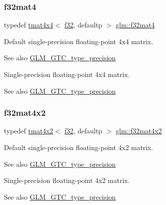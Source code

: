 \subsubsection{\texorpdfstring{f32mat4}{f32mat4}}
{\footnotesize\ttfamily typedef \hyperlink{structglm_1_1tmat4x4}{tmat4x4}$<$ \hyperlink{group__gtc__type__precision_ga0ec999b57f5330d9021256e96038df04}{f32}, defaultp $>$ \hyperlink{group__gtc__type__precision_ga47bc5ddfbd368423c9b762c03ba7e77f}{glm\+::f32mat4}}

Default single-\/precision floating-\/point 4x4 matrix. \begin{DoxySeeAlso}{See also}
\hyperlink{group__gtc__type__precision}{G\+L\+M\+\_\+\+G\+T\+C\+\_\+type\+\_\+precision}
\end{DoxySeeAlso}
Single-\/precision floating-\/point 4x4 matrix. \begin{DoxySeeAlso}{See also}
\hyperlink{group__gtc__type__precision}{G\+L\+M\+\_\+\+G\+T\+C\+\_\+type\+\_\+precision} 
\end{DoxySeeAlso}
\mbox{\label{group__gtc__type__precision_gab531a3d0479121732ae090254e0bd58f}} 
\subsubsection{\texorpdfstring{f32mat4x2}{f32mat4x2}}
{\footnotesize\ttfamily typedef \hyperlink{structglm_1_1tmat4x2}{tmat4x2}$<$ \hyperlink{group__gtc__type__precision_ga0ec999b57f5330d9021256e96038df04}{f32}, defaultp $>$ \hyperlink{group__gtc__type__precision_gab531a3d0479121732ae090254e0bd58f}{glm\+::f32mat4x2}}

Default single-\/precision floating-\/point 4x2 matrix. \begin{DoxySeeAlso}{See also}
\hyperlink{group__gtc__type__precision}{G\+L\+M\+\_\+\+G\+T\+C\+\_\+type\+\_\+precision}
\end{DoxySeeAlso}
Single-\/precision floating-\/point 4x2 matrix. \begin{DoxySeeAlso}{See also}
\hyperlink{group__gtc__type__precision}{G\+L\+M\+\_\+\+G\+T\+C\+\_\+type\+\_\+precision} 
\end{DoxySeeAlso}
\mbox{\label{group__gtc__type__precision_gad68d998fa74028e02bfadd4778bd549a}} 
